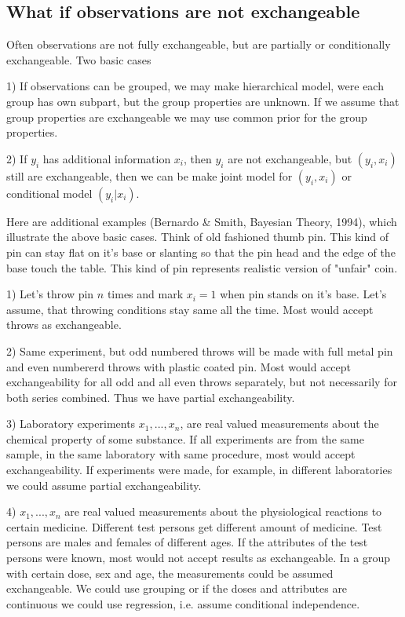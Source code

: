 \documentclass[a4paper,11pt,english]{article}
\begin{document}
\subsection*{What if observations are not exchangeable}

Often observations are not fully exchangeable, but are partially
or conditionally exchangeable. Two basic cases
\begin{list}{-}{\itemsep=0pt\parsep=4pt\topsep=4pt}
\item[1)] If observations can be grouped, we may make hierarchical
  model, were each group has own subpart, but the group properties
  are unknown. If we assume that group properties are exchangeable
  we may use common prior for the group properties.
\item[2)] If $y_i$ has additional information $x_i$, then
  $y_i$ are not exchangeable, but $(y_i,x_i)$ still are
  exchangeable, then we can be make joint model for $(y_i,x_i)$ or
  conditional model $(y_i|x_i)$.
\end{list}

Here are additional examples (Bernardo \& Smith, Bayesian Theory,
1994), which illustrate the above basic cases. Think of old
fashioned thumb pin. This kind of pin can stay flat on it's base or
slanting so that the pin head and the edge of the base touch the
table. This kind of pin represents realistic version of "unfair"
coin.
\begin{list}{-}{\itemsep=0pt\parsep=4pt\topsep=4pt}
\item[1)] Let's throw pin $n$ times and mark $x_i=1$ when pin stands
  on it's base. Let's assume, that throwing conditions stay same
  all the time. Most would accept throws as exchangeable.
\item[2)] Same experiment, but odd numbered throws will be made
  with full metal pin and even numbererd throws with plastic coated
  pin. Most would accept exchangeability for all odd and all even
  throws separately, but not necessarily for both series combined.
  Thus we have partial exchangeability.
\item[3)] Laboratory experiments $x_1,...,x_n$, are real valued
  measurements about the chemical property of some substance. If
  all experiments are from the same sample, in the same laboratory
  with same procedure, most would accept exchangeability. If
  experiments were made, for example, in different laboratories we
  could assume partial exchangeability.
\item[4)] $x_1,...,x_n$ are real valued measurements about the
  physiological reactions to certain medicine. Different test
  persons get different amount of medicine. Test persons are males and
  females of different ages. If the attributes of the test persons
  were known, most would not accept results as exchangeable.
  In a group with certain dose, sex and age, the measurements could
  be assumed exchangeable. We could use grouping or if the doses
  and attributes are continuous we could use regression, i.e.
  assume conditional independence.
\end{list}
\end{document}
